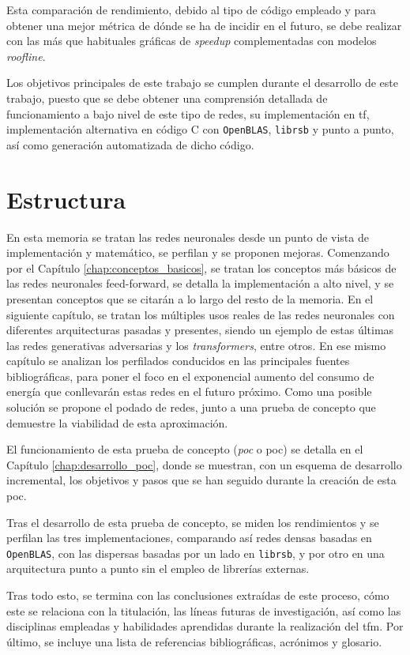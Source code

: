 Esta comparación de rendimiento, debido al tipo de código empleado y para obtener una mejor métrica de dónde se ha de incidir en el futuro, se debe realizar con las más que habituales gráficas de \textit{speedup} complementadas con modelos \textit{roofline}.

Los objetivos principales de este trabajo se cumplen durante el desarrollo de este trabajo, puesto que se debe obtener una comprensión detallada de funcionamiento a bajo nivel de este tipo de redes, su implementación en \acrlong{tf}, implementación alternativa en código C con \texttt{OpenBLAS}, \texttt{librsb} y punto a punto, así como generación automatizada de dicho código.

\section{Estructura}
\label{sec:estructura}
En esta memoria se tratan las redes neuronales desde un punto de vista de implementación y matemático, se perfilan y se proponen mejoras. Comenzando por el Capítulo \ref{chap:conceptos_basicos}, se tratan los conceptos más básicos de las redes neuronales feed-forward, se detalla la implementación a alto nivel, y se presentan conceptos que se citarán a lo largo del resto de la memoria. En el siguiente capítulo, se tratan los múltiples usos reales de las redes neuronales con diferentes arquitecturas pasadas y presentes, siendo un ejemplo de estas últimas las redes generativas adversarias y los \textit{transformers}, entre otros. En ese mismo capítulo se analizan los perfilados conducidos en las principales fuentes bibliográficas, para poner el foco en el exponencial aumento del consumo de energía que conllevarán estas redes en el futuro próximo. Como una posible solución se propone el podado de redes, junto a una prueba de concepto que demuestre la viabilidad de esta aproximación.

El funcionamiento de esta prueba de concepto (\textit{\acrlong{poc}} o \acrshort{poc}) se detalla en el Capítulo \ref{chap:desarrollo_poc}, donde se muestran, con un esquema de desarrollo incremental, los objetivos y pasos que se han seguido durante la creación de esta \acrshort{poc}.

Tras el desarrollo de esta prueba de concepto, se miden los rendimientos y se perfilan las tres implementaciones, comparando así redes densas basadas en \texttt{OpenBLAS}, con las dispersas basadas por un lado en \texttt{librsb}, y por otro en una arquitectura punto a punto sin el empleo de librerías externas.

Tras todo esto, se termina con las conclusiones extraídas de este proceso, cómo este se relaciona con la titulación, las líneas futuras de investigación, así como las disciplinas empleadas y habilidades aprendidas durante la realización del \acrshort{tfm}. Por último, se incluye una lista de referencias bibliográficas, acrónimos y glosario.
